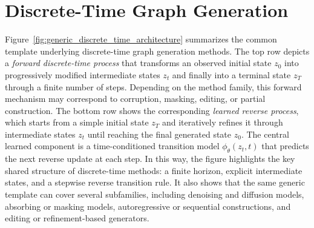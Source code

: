 \documentclass{article}
\begin{document}
\section{Discrete-Time Graph Generation}
\label{sec:discrete_time}

Figure~\ref{fig:generic_discrete_time_architecture} summarizes the common template underlying discrete-time graph generation methods. The top row depicts a \emph{forward discrete-time process} that transforms an observed initial state $z_0$ into progressively modified intermediate states $z_t$ and finally into a terminal state $z_T$ through a finite number of steps. Depending on the method family, this forward mechanism may correspond to corruption, masking, editing, or partial construction. The bottom row shows the corresponding \emph{learned reverse process}, which starts from a simple initial state $z_T$ and iteratively refines it through intermediate states $z_t$ until reaching the final generated state $z_0$. The central learned component is a time-conditioned transition model $\phi_\theta(z_t,t)$ that predicts the next reverse update at each step. In this way, the figure highlights the key shared structure of discrete-time methods: a finite horizon, explicit intermediate states, and a stepwise reverse transition rule. It also shows that the same generic template can cover several subfamilies, including denoising and diffusion models, absorbing or masking models, autoregressive or sequential constructions, and editing or refinement-based generators.
\end{document}
